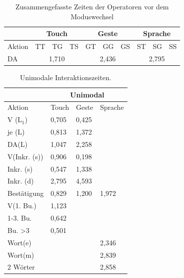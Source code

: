 \begin{table}[ht]
  \centering
	\begin{tabular}{|l|l|l|l|l|l|l|l|l|l|}
		\hline
		& \multicolumn{3}{|c|}{Touch} & \multicolumn{3}{|c|}{Geste}&\multicolumn{3}{|c|}{Sprache}\\
		\hline
		Aktion 					& TT 		& TG 		& TS 		& GT 		& GG 		& GS 		& ST 		& SG 		& SS\\
		\hline
		DA 	& \multicolumn{3}{|c|}{1,710} &	\multicolumn{3}{|c|}{2,436} 	&	\multicolumn{3}{|c|}{2,795} \\
		\hline
  \end{tabular}
	\caption{Zusammengefasste Zeiten der Operatoren vor dem Moduswechsel}
\label{tab:DA}
\end{table}
\begin{table}[ht]
  \centering
			\begin{tabular}{|l|l|l|l|}
					\hline
				& \multicolumn{3}{|c|}{Unimodal}\\
				\hline
				Aktion 					& Touch & Geste & Sprache \\
				\hline
				V (L$_1$) 		& {0,705} 	&	{0,425}	&	\\
				\hline
				je (L)				& {0,813} &	{1,372} &\\
				\hline
				DA(L)						& {1,047} &	{2,258} & \\
				\hline
				V(Inkr. (s))		& {0,906} &	{0,198} &\\
				\hline
				Inkr. (s)			& {0,547} &	{1,338} &\\
				\hline
				Inkr. (d)					& {2,795} &	4,593 & \\
				\hline
				Bestätigung 		& {0,829} &{1,200} & {1,972}\\
				\hline
				V(1. Bu.)					& {1,123} 	& 	&\\
				\hline
				1-3. Bu.					& {0,642} & 	& \\
				\hline
				Bu. >3 					& {0,501}		&  	& \\
				\hline
				Wort(e)					& & & {2,346} \\
				\hline
				Wort(m) 				& & & {2,839}\\
				\hline
				2 Wörter 				& & & {2,858}\\
				\hline
			\end{tabular}
	\caption{Unimodale Interaktionszeiten.}
	\label{tab:AktionenUnimodal}
\end{table}

